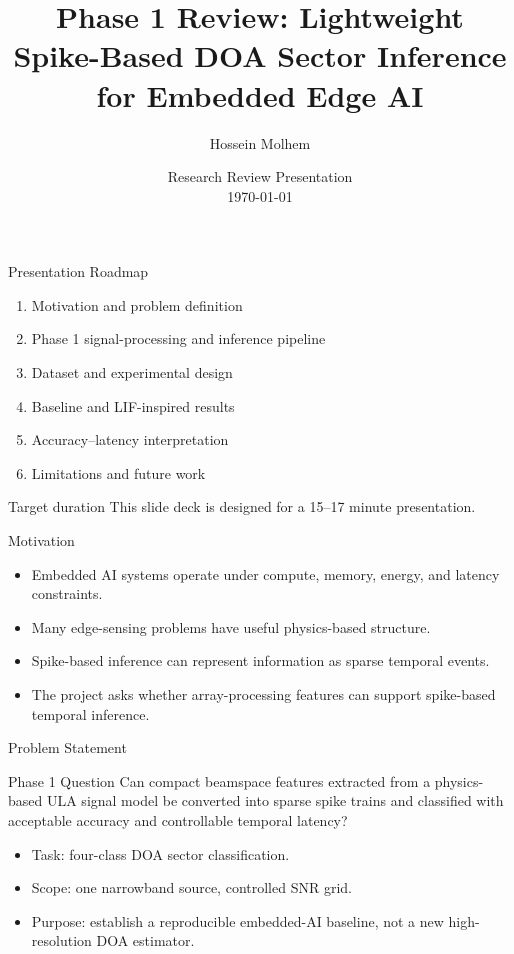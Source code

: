 \documentclass[aspectratio=169]{beamer}
\title[Phase 1 Review]{Phase 1 Review: Lightweight Spike-Based DOA Sector Inference for Embedded Edge AI}
\author{Hossein Molhem}
\institute{Kennesaw State University\\EE 6900 Special Topics: Embedded AI for Autonomous Robots}
\date{Research Review Presentation\\\today}
\begin{document}
\begin{frame}
\titlepage
\end{frame}

\begin{frame}{Presentation Roadmap}
\begin{enumerate}
    \item Motivation and problem definition
    \item Phase 1 signal-processing and inference pipeline
    \item Dataset and experimental design
    \item Baseline and LIF-inspired results
    \item Accuracy--latency interpretation
    \item Limitations and future work
\end{enumerate}
\begin{block}{Target duration}
This slide deck is designed for a 15--17 minute presentation.
\end{block}
\end{frame}

\begin{frame}{Motivation}
\begin{itemize}
    \item Embedded AI systems operate under compute, memory, energy, and latency constraints.
    \item Many edge-sensing problems have useful physics-based structure.
    \item Spike-based inference can represent information as sparse temporal events.
    \item The project asks whether array-processing features can support spike-based temporal inference.
\end{itemize}
\end{frame}

\begin{frame}{Problem Statement}
\begin{block}{Phase 1 Question}
Can compact beamspace features extracted from a physics-based ULA signal model be converted into sparse spike trains and classified with acceptable accuracy and controllable temporal latency?
\end{block}
\vspace{0.2cm}
\begin{itemize}
    \item Task: four-class DOA sector classification.
    \item Scope: one narrowband source, controlled SNR grid.
    \item Purpose: establish a reproducible embedded-AI baseline, not a new high-resolution DOA estimator.
\end{itemize}
\end{frame}
\end{document}
